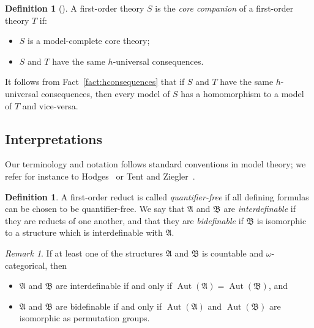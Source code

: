 \documentclass{amsart}
\theoremstyle{definition}
\newtheorem{definition}[theorem]{Definition}
\theoremstyle{remark}
\newtheorem{remark}[theorem]{Remark}
\numberwithin{equation}{section}
\newcommand{\aut}{\operatorname{Aut}}
\newcommand{\fa}{\mathfrak{A}}
\newcommand{\fb}{\mathfrak{B}}
\begin{document}
\begin{definition}[\cite{BodHilsMartin-Journal}]  A first-order theory $S$ is the \emph{core companion} of a first-order theory $T$ if:
\begin{itemize}
    \item $S$ is a model-complete core  theory;
    \item $S$ and $T$ have the same $h$-universal consequences.
\end{itemize}
\end{definition}
{It follows from} Fact~\ref{fact:hconsequences} that 
if $S$ and $T$ have the same $h$-universal consequences, {then} every model of $S$ has a homomorphism to a model of $T$ and vice-versa.



\subsection{Interpretations}
Our terminology and notation follows standard conventions in model theory; we refer for instance to Hodges~\cite{HodgesLong} or Tent and Ziegler~\cite{Tent-Ziegler}.

\begin{definition}
    A first-order reduct is called \emph{quantifier-free} if all defining formulas can be chosen to be quantifier-free.
    We say that $\fa$ and $\fb$ are \emph{interdefinable} if they are reducts of one another, and that they are \emph{bidefinable} if $\fb$ is isomorphic to a structure which is interdefinable with $\fa$.
\end{definition}

\begin{remark}
    If at least one of the structures $\fa$ and $\fb$ is countable and $\omega$-categorical, then 
    \begin{itemize}
        \item $\fa$ and $\fb$ are interdefinable if and only if $\aut(\fa)=\aut(\fb)$, and 
        \item $\fa$ and $\fb$ are bidefinable if and only if  $\aut(\fa)$ and $\aut(\fb)$ are isomorphic as permutation groups.
    \end{itemize}
\end{remark}
\end{document}
